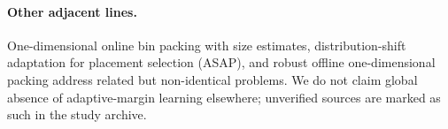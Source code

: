 \paragraph{Other adjacent lines.}
One-dimensional online bin packing with size estimates, distribution-shift
adaptation for placement selection (ASAP), and robust offline one-dimensional
packing address related but non-identical problems. We do not claim global
absence of adaptive-margin learning elsewhere; unverified sources are marked as
such in the study archive.
